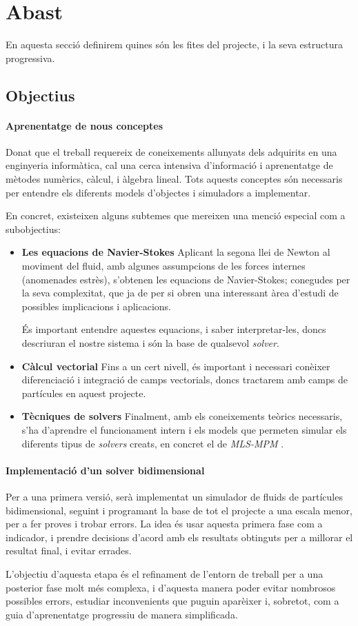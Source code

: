 \documentclass[a4paper]{article} %
\begin{document}
	\section{Abast}
	En aquesta secció definirem quines són les fites del projecte, i la seva estructura progressiva.
	\subsection{Objectius}
	\paragraph{\quad Aprenentatge de nous conceptes} Donat que el treball requereix de coneixements allunyats dels adquirits en una enginyeria informàtica, cal una cerca intensiva d'informació i aprenentatge de mètodes numèrics, càlcul, i àlgebra lineal. Tots aquests conceptes són necessaris per entendre els diferents models d'objectes i simuladors a implementar. \par
	En concret, existeixen alguns subtemes que mereixen una menció especial com a subobjectius:
	
	\begin{itemize}
		\item \textbf{Les equacions de Navier-Stokes} Aplicant la segona llei de Newton al moviment del fluid, amb algunes assumpcions de les forces internes (anomenades estrès), s'obtenen les equacions de Navier-Stokes; conegudes per la seva complexitat, que ja de per si obren una interessant àrea d'estudi de possibles implicacions i aplicacions.
		\par
		És important entendre aquestes equacions, i saber interpretar-les, doncs descriuran el nostre sistema i són la base de qualsevol \textit{solver}.
	\item \textbf{Càlcul vectorial} Fins a un cert nivell, és important i necessari conèixer diferenciació i integració de camps vectorials, doncs tractarem amb camps de partícules en aquest projecte.
	\item \textbf{Tècniques de solvers} Finalment, amb els coneixements teòrics necessaris, s'ha d'aprendre el funcionament intern i els models que permeten simular els diferents tipus de \textit{solvers} creats, en concret el de \textit{MLS-MPM} \cite{hu2018mlsmpmcpic}.
	\end{itemize}
	\paragraph{\quad Implementació d'un solver bidimensional} Per a una primera versió, serà implementat un simulador de fluids de partícules bidimensional, seguint\cite{Hu,hu2018mlsmpmcpic} i programant la base de tot el projecte a una escala menor, per a fer proves i trobar errors. La idea és usar aquesta primera fase com a indicador, i prendre decisions d'acord amb els resultats obtinguts per a millorar el resultat final, i evitar errades. \par
	L'objectiu d'aquesta etapa és el refinament de l'entorn de treball per a una posterior fase molt més complexa, i d'aquesta manera poder evitar nombrosos possibles errors, estudiar inconvenients que puguin aparèixer i, sobretot, com a guia d'aprenentatge progressiu de manera simplificada. 
	
\end{document}
